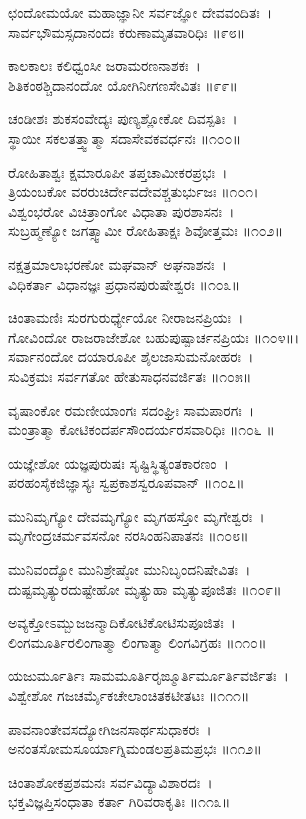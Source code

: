 ಛಂದೋಮಯೋ ಮಹಾಜ್ಞಾನೀ ಸರ್ವಜ್ಞೋ ದೇವವಂದಿತಃ~।\\
ಸಾರ್ವಭೌಮಸ್ಸದಾನಂದಃ ಕರುಣಾಮೃತವಾರಿಧಿಃ ॥೯೮॥

	ಕಾಲಕಾಲಃ ಕಲಿಧ್ವಂಸೀ ಜರಾಮರಣನಾಶಕಃ~।\\
	ಶಿತಿಕಂಠಶ್ಚಿದಾನಂದೋ ಯೋಗಿನೀಗಣಸೇವಿತಃ ॥೯೯॥

ಚಂಡೀಶಃ ಶುಕಸಂವೇದ್ಯಃ ಪುಣ್ಯಶ್ಲೋಕೋ ದಿವಸ್ಪತಿಃ~।\\
ಸ್ಥಾಯೀ ಸಕಲತತ್ತ್ವಾತ್ಮಾ ಸದಾಸೇವಕವರ್ಧನಃ ॥೧೦೦॥

	ರೋಹಿತಾಶ್ವಃ ಕ್ಷಮಾರೂಪೀ ತಪ್ತಚಾಮೀಕರಪ್ರಭಃ~।\\
	ತ್ರಿಯಂಬಕೋ ವರರುಚಿರ್ದೇವದೇವಶ್ಚತುರ್ಭುಜಃ ॥೧೦೧।\\

ವಿಶ್ವಂಭರೋ ವಿಚಿತ್ರಾಂಗೋ ವಿಧಾತಾ ಪುರಶಾಸನಃ~।\\
ಸುಬ್ರಹ್ಮಣ್ಯೋ ಜಗತ್ಸ್ವಾಮೀ ರೋಹಿತಾಕ್ಷಃ ಶಿವೋತ್ತಮಃ ॥೧೦೨॥

	ನಕ್ಷತ್ರಮಾಲಾಭರಣೋ ಮಘವಾನ್ ಅಘನಾಶನಃ~।\\
	ವಿಧಿಕರ್ತಾ ವಿಧಾನಜ್ಞಃ ಪ್ರಧಾನಪುರುಷೇಶ್ವರಃ ॥೧೦೩॥

ಚಿಂತಾಮಣಿಃ ಸುರಗುರುರ್ಧ್ಯೇಯೋ ನೀರಾಜನಪ್ರಿಯಃ~।\\
ಗೋವಿಂದೋ ರಾಜರಾಜೇಶೋ ಬಹುಪುಷ್ಪಾರ್ಚನಪ್ರಿಯಃ ॥೧೦೪॥।\\

ಸರ್ವಾನಂದೋ ದಯಾರೂಪೀ ಶೈಲಜಾಸುಮನೋಹರಃ~।\\
ಸುವಿಕ್ರಮಃ ಸರ್ವಗತೋ ಹೇತುಸಾಧನವರ್ಜಿತಃ ॥೧೦೫॥

	ವೃಷಾಂಕೋ ರಮಣೀಯಾಂಗಃ ಸದಂಘ್ರಿಃ ಸಾಮಪಾರಗಃ~।\\
	ಮಂತ್ರಾತ್ಮಾ ಕೋಟಿಕಂದರ್ಪಸೌಂದರ್ಯರಸವಾರಿಧಿಃ ॥೧೦೬ ॥

ಯಜ್ಞೇಶೋ ಯಜ್ಞಪುರುಷಃ ಸೃಷ್ಟಿಸ್ಥಿತ್ಯಂತಕಾರಣಂ~।\\
ಪರಹಂಸೈಕಜಿಜ್ಞಾಸ್ಯಃ ಸ್ವಪ್ರಕಾಶಸ್ವರೂಪವಾನ್ ॥೧೦೭॥

	ಮುನಿಮೃಗ್ಯೋ ದೇವಮೃಗ್ಯೋ ಮೃಗಹಸ್ತೋ ಮೃಗೇಶ್ವರಃ~।\\
	ಮೃಗೇಂದ್ರಚರ್ಮವಸನೋ ನರಸಿಂಹನಿಪಾತನಃ ॥೧೦೮॥

ಮುನಿವಂದ್ಯೋ ಮುನಿಶ್ರೇಷ್ಠೋ ಮುನಿಬೃಂದನಿಷೇವಿತಃ~।\\
ದುಷ್ಟಮೃತ್ಯುರದುಷ್ಟೇಹೋ ಮೃತ್ಯುಹಾ ಮೃತ್ಯುಪೂಜಿತಃ ॥೧೦೯॥

	ಅವ್ಯಕ್ತೋಽಮ್ಬುಜಜನ್ಮಾದಿಕೋಟಿಕೋಟಿಸುಪೂಜಿತಃ~।\\
	ಲಿಂಗಮೂರ್ತಿರಲಿಂಗಾತ್ಮಾ ಲಿಂಗಾತ್ಮಾ ಲಿಂಗವಿಗ್ರಹಃ ॥೧೧೦॥

ಯಜುರ್ಮೂರ್ತಿಃ ಸಾಮಮೂರ್ತಿರೃಙ್ಮೂರ್ತಿರ್ಮೂರ್ತಿವರ್ಜಿತಃ~।\\
ವಿಶ್ವೇಶೋ ಗಜಚರ್ಮೈಕಚೇಲಾಂಚಿತಕಟೀತಟಃ ॥೧೧೧॥

	ಪಾವನಾಂತೇವಸದ್ಯೋಗಿಜನಸಾರ್ಥಸುಧಾಕರಃ~।\\
	ಅನಂತಸೋಮಸೂರ್ಯಾಗ್ನಿಮಂಡಲಪ್ರತಿಮಪ್ರಭಃ ॥೧೧೨॥

ಚಿಂತಾಶೋಕಪ್ರಶಮನಃ ಸರ್ವವಿದ್ಯಾವಿಶಾರದಃ~।\\
ಭಕ್ತವಿಜ್ಞಪ್ತಿಸಂಧಾತಾ ಕರ್ತಾ ಗಿರಿವರಾಕೃತಿಃ ॥೧೧೩॥

